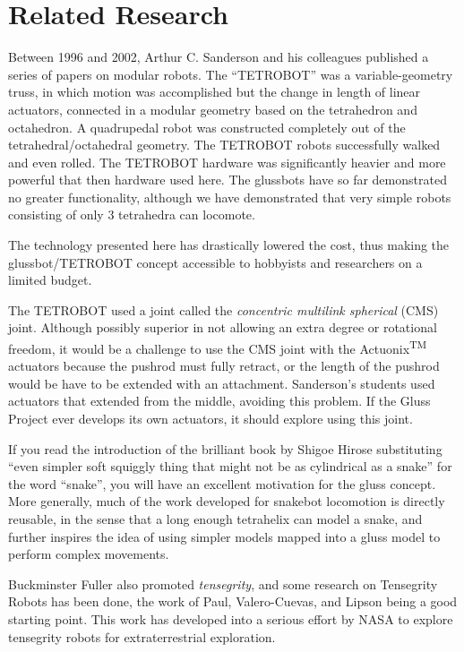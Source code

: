 \documentclass[11pt]{article}
\begin{document}
\section{Related Research}

Between 1996 and 2002, Arthur C. Sanderson and his colleagues published a series of
papers\cite{sanderson1996modular,lee2002dynamic,lee1999dynamics} on modular robots.
The ``TETROBOT'' was a variable-geometry truss, in which motion was accomplished but the change
in length of linear actuators, connected in a modular geometry based on the tetrahedron and octahedron.
A quadrupedal robot was constructed completely out of the tetrahedral/octahedral geometry.
The TETROBOT robots successfully walked and even rolled. The TETROBOT hardware was significantly
heavier and more powerful that then hardware used here. The glussbots have so far demonstrated no greater functionality,
although we have demonstrated that very simple robots consisting of only 3 tetrahedra can locomote.

The technology presented here has drastically lowered the cost,
thus making the glussbot/TETROBOT concept
accessible to hobbyists and researchers on a limited budget.

The TETROBOT used a joint called the \emph{concentric multilink spherical} (CMS) joint. Although
possibly superior in not allowing an extra degree or rotational freedom, it would be a challenge to use the CMS
joint with the Actuonix\textsuperscript{TM} actuators because the pushrod must fully retract, or the length of the pushrod would be
have to be extended with an attachment. Sanderson's students used actuators that
extended from the middle, avoiding this problem. If the Gluss Project ever develops its own actuators, it should
explore using this joint.

If you read the introduction of the brilliant book by Shigoe Hirose\cite{hirose1993biologically} substituting
``even simpler soft squiggly thing that might not be as cylindrical as a snake'' for the word ``snake'', you will have
an excellent motivation for the gluss concept.  More generally, much of the work developed for snakebot
locomotion\cite{liljebäck2012snake} is directly reusable, in the sense that a long enough tetrahelix can
model a snake, and further inspires the idea of using simpler models mapped into a gluss model to perform
complex movements.

Buckminster Fuller also promoted \emph{tensegrity}, and some research on Tensegrity Robots has been done, the
work of Paul, Valero-Cuevas, and Lipson\cite{paul2006} being a good starting point.
This work has developed into a serious effort\cite{NTRT} by NASA to explore tensegrity robots
for extraterrestrial
exploration.
\end{document}
